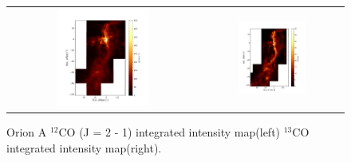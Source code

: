 \begin{figure}[h]
	\begin{center}
		\begin{tabular}{cc}
			\includegraphics[width=0.5\textwidth]{RNE_12CO_Orion.png} & \includegraphics[width=0.5\textwidth]{Orion_13CO_intmap.png}
		\end{tabular}
	\end{center}
	\caption{Orion A $^{12}$CO (J = 2 - 1) integrated intensity map(left) $^{13}$CO integrated intensity map(right).}
\end{figure}

